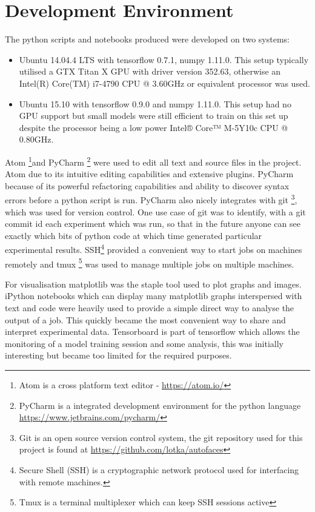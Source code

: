   \section{Development Environment}
    The python scripts and notebooks produced were developed on two systems:
    \begin{itemize}
      \item     Ubuntu 14.04.4 LTS with tensorflow 0.7.1, numpy 1.11.0. This setup typically utilised a GTX Titan X GPU with driver version 352.63, otherwise
                an Intel(R) Core(TM) i7-4790 CPU @ 3.60GHz or equivalent processor was used.
      \item     Ubuntu 15.10 with tensorflow 0.9.0 and numpy 1.11.0. This setup had no GPU support but small models were still efficient to train on this set up
                despite the processor being a low power Intel® Core™ M-5Y10c CPU @ 0.80GHz.
    \end{itemize}
    Atom \footnote{Atom is a cross platform text editor - \url{https://atom.io/}}and PyCharm \footnote{PyCharm is a integrated development environment for the python language \url{https://www.jetbrains.com/pycharm/}} were used to edit all text and source files in the project.
    Atom due to its intuitive editing capabilities and extensive plugins. PyCharm because
    of its powerful refactoring capabilities and ability to discover syntax errors before
    a python script is run. PyCharm also nicely integrates with git \footnote{Git is an open source version control system,
    the git repository used for this project is found at \url{https://github.com/lotka/autofaces}}, which was used for version control.
    One use case of git was to identify, with a git commit id each experiment which was run, so that in the future
    anyone can see exactly which bits of python code at which time generated particular experimental results.
    SSH\footnote{Secure Shell (SSH) is a cryptographic network protocol used for interfacing with remote machines.} provided a convenient way to start jobs on machines remotely and tmux \footnote{Tmux is a terminal
    multiplexer which can keep SSH sessions active} was used to manage multiple jobs on multiple machines.

    For visualisation matplotlib was the staple tool used to plot graphs and images. iPython notebooks
    which can display many matplotlib graphs interspersed with text and code were heavily used to
    provide a simple direct way to analyse the output of a job. This quickly became the most convenient way to
    share and interpret experimental data. Tensorboard is part of tensorflow which allows the monitoring of a
    model training session and some analysis, this was initially interesting but became too limited for the required purposes.
